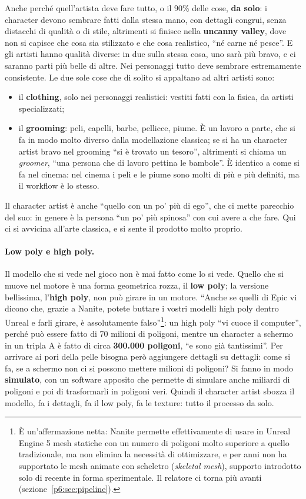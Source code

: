 Anche perché quell'artista deve fare tutto, o il 90\% delle cose, \textbf{da
solo}: i character devono sembrare fatti dalla stessa mano, con dettagli
congrui, senza distacchi di qualità o di stile, altrimenti si finisce nella
\textbf{uncanny valley}, dove non si capisce che cosa sia stilizzato e che cosa
realistico, ``né carne né pesce''. E gli artisti hanno qualità diverse: in due
sulla stessa cosa, uno sarà più bravo, e ci saranno parti più belle di altre.
Nei personaggi tutto deve sembrare estremamente consistente. Le due sole cose
che di solito si appaltano ad altri artisti sono:
\begin{itemize}
  \item il \textbf{clothing}, solo nei personaggi realistici: vestiti fatti con
        la fisica, da artisti specializzati;
  \item il \textbf{grooming}: peli, capelli, barbe, pellicce, piume. È un lavoro
        a parte, che si fa in modo molto diverso dalla modellazione classica;
        se si ha un character artist bravo nel grooming ``si è trovato un
        tesoro'', altrimenti si chiama un \emph{groomer}, ``una persona che di
        lavoro pettina le bambole''. È identico a come si fa nel cinema: nel
        cinema i peli e le piume sono molti di più e più definiti, ma il
        workflow è lo stesso.
\end{itemize}
Il character artist è anche ``quello con un po' più di ego'', che ci mette
parecchio del suo: in genere è la persona ``un po' più spinosa'' con cui avere a
che fare. Qui ci si avvicina all'arte classica, e si sente il prodotto molto
proprio.

\paragraph{Low poly e high poly.} Il modello che si vede nel gioco non è mai
fatto come lo si vede. Quello che si muove nel motore è una forma geometrica
rozza, il \textbf{low poly}; la versione bellissima, l'\textbf{high poly},
non può girare in un motore. ``Anche se quelli di Epic vi dicono che, grazie a
Nanite, potete buttare i vostri modelli high poly dentro Unreal e farli girare,
è assolutamente falso''\footnote{È un'affermazione netta: Nanite permette
effettivamente di usare in Unreal Engine 5 mesh statiche con un numero di
poligoni molto superiore a quello tradizionale, ma non elimina la necessità di
ottimizzare, e per anni non ha supportato le mesh animate con scheletro
(\emph{skeletal mesh}), supporto introdotto solo di recente in forma
sperimentale. Il relatore ci torna più avanti
(sezione~\ref{p6:sec:pipeline}).}: un high poly ``vi cuoce il computer'',
perché può essere fatto di 70 milioni di poligoni, mentre un character a
schermo in un tripla A è fatto di circa \textbf{300.000 poligoni}, ``e sono già
tantissimi''. Per arrivare ai pori della pelle bisogna però aggiungere dettagli
su dettagli: come si fa, se a schermo non ci si possono mettere milioni di
poligoni? Si fanno in modo \textbf{simulato}, con un software apposito che
permette di simulare anche miliardi di poligoni e poi di trasformarli in
poligoni veri. Quindi il character artist sbozza il modello, fa i dettagli, fa
il low poly, fa le texture: tutto il processo da solo.


